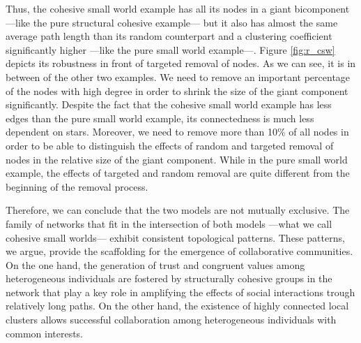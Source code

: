 Thus, the cohesive small world example has all its nodes in a giant bicomponent ---like the pure structural cohesive example--- but it also has almost the same average path length than its random counterpart and a clustering coefficient significantly higher ---like the pure small world example---. Figure \ref{fig:r_csw} depicts its robustness in front of targeted removal of nodes. As we can see, it is in between of the other two examples. We need to remove an important percentage of the nodes with high degree in order to shrink the size of the giant component significantly. Despite the fact that the cohesive small world example has less edges than the pure small world example, its connectedness is much less dependent on stars. Moreover, we need to remove more than 10\% of all nodes in order to be able to distinguish the effects of random and targeted removal of nodes in the relative size of the giant component. While in the pure small world example, the effects of targeted and random removal are quite different from the beginning of the removal process.

Therefore, we can conclude that the two models are not mutually exclusive. The family of networks that fit in the intersection of both models ---what we call cohesive small worlds--- exhibit consistent topological patterns. These patterns, we argue, provide the scaffolding for the emergence of collaborative communities. On the one hand, the generation of trust and congruent values among heterogeneous individuals are fostered by structurally cohesive groups in the network that play a key role in amplifying the effects of social interactions trough relatively long paths. On the other hand, the existence of highly connected local clusters allows successful collaboration among heterogeneous individuals with common interests.

